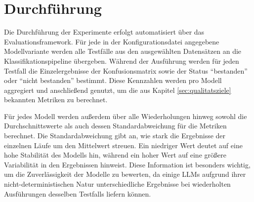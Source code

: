 \section{Durchführung}\label{sec:durchfuhrung}

Die Durchführung der Experimente erfolgt automatisiert über das Evaluationsframework.  Für jede in der Konfigurationsdatei angegebene Modellvariante werden alle Testfälle aus den ausgewählten Datensätzen an die Klassifikationspipeline übergeben. Während der Ausführung werden für jeden Testfall die Einzelergebnisse der Konfusionsmatrix sowie der Status \enquote{bestanden} oder \enquote{nicht bestanden} bestimmt. Diese Kennzahlen werden pro Modell aggregiert und anschließend genutzt, um die aus Kapitel \ref{sec:qualitatsziele} bekannten Metriken zu berechnet.

Für jedes Modell werden außerdem über alle Wiederholungen hinweg sowohl die Durchschnittswerte als auch dessen Standardabweichung für die Metriken berechnet. Die Standardabweichung gibt an, wie stark die Ergebnisse der einzelnen Läufe um den Mittelwert streuen. Ein niedriger Wert deutet auf eine hohe Stabilität des Modells hin, während ein hoher Wert auf eine größere Variabilität in den Ergebnissen hinweist. Diese Information ist besonders wichtig, um die Zuverlässigkeit der Modelle zu bewerten, da einige \acp{LLM} aufgrund ihrer nicht-deterministischen Natur unterschiedliche Ergebnisse bei wiederholten Ausführungen desselben Testfalls liefern können.